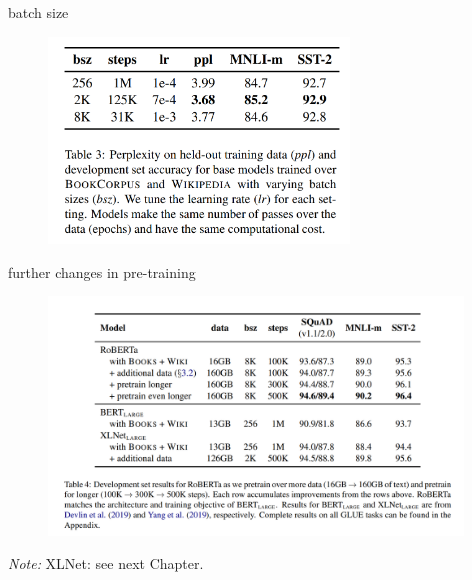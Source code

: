 
\begin{frame}{batch size}

\vfill

\begin{figure}
\centering
\includegraphics[width = 8cm]{figure/52-roberta-undertrained.png}\\ 
\end{figure}

\vfill

\end{frame}


\begin{frame}{further changes in pre-training}

\vfill

\begin{figure}
\centering
\includegraphics[width = 11cm]{figure/52-roberta-undertrained2.png}\\ 
\end{figure}

\vfill

\scriptsize
\textit{Note:} XLNet: see next Chapter.

\end{frame}

